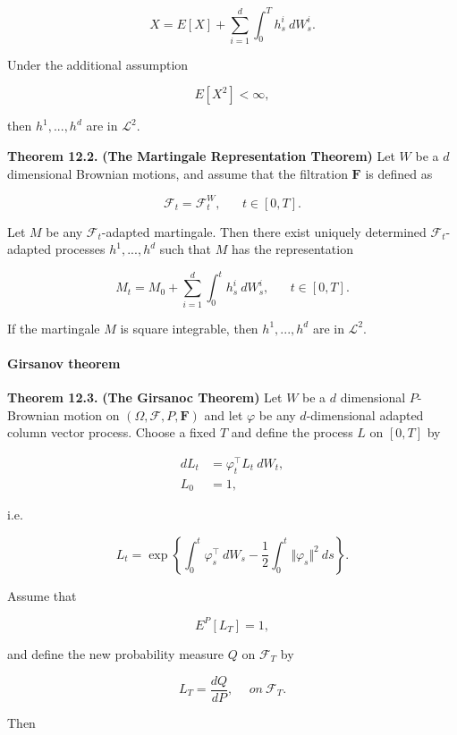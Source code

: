 \documentclass[
]{article}
\begin{document}
\[
X=E[X]+\sum_{i=1}^d\int_0^Th^i_s\ dW_s^i.
\]

Under the additional assumption

\[
E[X^2]<\infty,
\]

then \(h^1,...,h^d\) are in \(\mathcal{L}^2\).

\textbf{Theorem 12.2.} \textbf{(The Martingale Representation Theorem)}
Let \(W\) be a \(d\) dimensional Brownian motions, and assume that the
filtration \(\mathbf{F}\) is defined as

\[
\mathcal{F}_t=\mathcal{F}^W_t,\hspace{20pt}t\in[0,T].
\]

Let \(M\) be any \(\mathcal{F}_t\)-adapted martingale. Then there exist
uniquely determined \(\mathcal{F}_t\)-adapted processes \(h^1,...,h^d\)
such that \(M\) has the representation

\[
M_t=M_0+\sum_{i=1}^d\int_0^t h_s^i\ dW_s^i,\hspace{20pt}t\in[0,T].
\]

If the martingale \(M\) is square integrable, then \(h^1,...,h^d\) are
in \(\mathcal{L}^2\).

\hypertarget{girsanov-theorem}{%
\paragraph{Girsanov theorem}\label{girsanov-theorem}}

\textbf{Theorem 12.3.} \textbf{(The Girsanoc Theorem)} Let \(W\) be a
\(d\) dimensional \(P\)-Brownian motion on
\((\Omega,\mathcal{F},P,\mathbf{F})\) and let \(\varphi\) be any
\(d\)-dimensional adapted column vector process. Choose a fixed \(T\)
and define the process \(L\) on \([0,T]\) by

\begin{align*}
dL_t&=\varphi^\top_t L_t\ dW_t,\\
L_0&=1,
\end{align*}

i.e.

\[
L_t = \exp\left\{\int_0^t \varphi^\top_s\ dW_s - \frac{1}{2}\int_0^t \Vert\varphi_s\Vert ^2\ ds\right\}.
\]

Assume that

\[
E^P[L_T]=1,
\]

and define the new probability measure \(Q\) on \(\mathcal{F}_T\) by

\[
L_T=\frac{dQ}{dP},\hspace{15pt}on\ \mathcal{F}_T.
\]

Then
\end{document}

